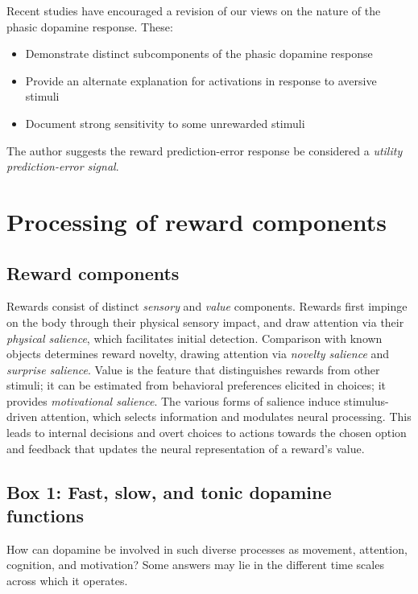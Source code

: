 \documentclass{article}
\numberwithin{equation}{section}
\begin{document}
Recent studies have encouraged a revision of our views on the nature of the phasic dopamine response. These:

\begin{itemize}
\item Demonstrate distinct subcomponents of the phasic dopamine response
\item Provide an alternate explanation for activations in response to aversive stimuli
\item Document strong sensitivity to some unrewarded stimuli
\end{itemize}

The author suggests the reward prediction-error response be considered a \textit{utility prediction-error signal}.

\section{Processing of reward components}
\subsection{Reward components}

Rewards consist of distinct \textit{sensory} and \textit{value} components. Rewards first impinge on the body through their physical sensory impact, and draw attention via their \textit{physical salience}, which facilitates initial detection. Comparison with known objects determines reward novelty, drawing attention via \textit{novelty salience} and \textit{surprise salience}. Value is the feature that distinguishes rewards from other stimuli; it can be estimated from behavioral preferences elicited in choices; it provides \textit{motivational salience}. The various forms of salience induce stimulus-driven attention, which selects information and modulates neural processing. This leads to internal decisions and overt choices to actions towards the chosen option and feedback that updates the neural representation of a reward's value.

\subsection{Box 1: Fast, slow, and tonic dopamine functions}

How can dopamine be involved in such diverse processes as movement, attention, cognition, and motivation? Some answers may lie in the different time scales across which it operates.
\end{document}
